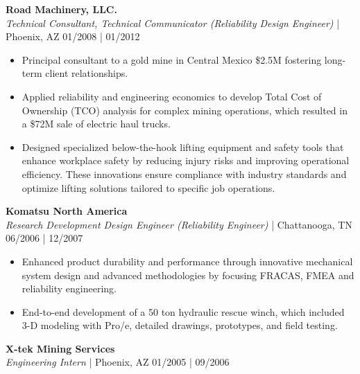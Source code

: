\documentclass[10pt, letterpaper, sans]{article}
\begin{document}
\newpage

\textbf{Road Machinery, LLC.} \\
\textit{Technical Consultant, Technical Communicator (Reliability Design Engineer)} | Phoenix, AZ \hfill 01/2008 | 01/2012

\begin{itemize} 
    
    \item Principal consultant to a gold mine in Central Mexico \$2.5M fostering long-term client relationships.

    \item Applied reliability and engineering economics to develop Total Cost of Ownership (TCO) analysis for complex mining operations, which resulted in a \$72M sale of electric haul trucks. 

    \item Designed specialized below-the-hook lifting equipment and safety tools that enhance workplace safety by reducing injury risks and improving operational efficiency. These innovations ensure compliance with industry standards and optimize lifting solutions tailored to specific job operations.
  
\end{itemize}

\textbf{Komatsu North America} \\
\textit{Research Development Design Engineer (Reliability Engineer)} | Chattanooga, TN \hfill 06/2006 | 12/2007

\begin{itemize} 
    
    \item Enhanced product durability and performance through innovative mechanical system design and advanced methodologies by focusing FRACAS, FMEA and reliability engineering. 

    \item End-to-end development of a 50 ton hydraulic rescue winch, which included 3-D modeling with Pro/e, detailed drawings, prototypes, and field testing.
  
\end{itemize}

\textbf{X-tek Mining Services} \\
\textit{Engineering Intern} | Phoenix, AZ \hfill 01/2005 | 09/2006
\end{document}
